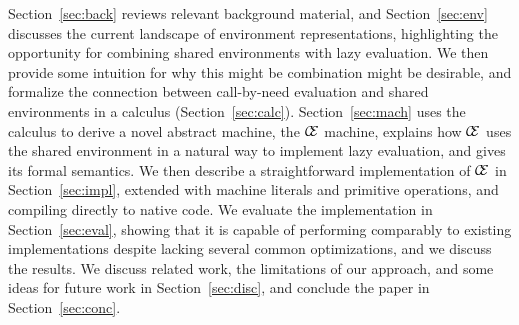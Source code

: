 Section~\ref{sec:back} reviews relevant background material, and
Section~\ref{sec:env} discusses the current landscape of environment
representations, highlighting the opportunity for combining shared environments
with lazy evaluation.  We then provide some intuition for why this might be
combination might be desirable, and formalize the connection between call-by-need
evaluation and shared environments in a calculus (Section~\ref{sec:calc}).
Section~\ref{sec:mach} uses the calculus to derive a novel abstract machine,
the $\mathcal{\mathcal{C} \mskip -4mu \mathcal{E}}$ machine, explains how
$\mathcal{\mathcal{C} \mskip -4mu \mathcal{E}}$ uses the shared environment in
a natural way to implement lazy evaluation, and gives its formal semantics.  We
then describe a straightforward implementation of $\mathcal{\mathcal{C} \mskip
-4mu \mathcal{E}}$ in Section~\ref{sec:impl}, extended with machine literals
and primitive operations, and compiling directly to native code. We evaluate the
implementation in Section~\ref{sec:eval}, showing that it is capable of
performing comparably to existing implementations despite lacking several
common optimizations, and we discuss the results. We discuss related work, the
limitations of our approach, and some ideas for future work in
Section~\ref{sec:disc}, and conclude the paper in Section~\ref{sec:conc}.


